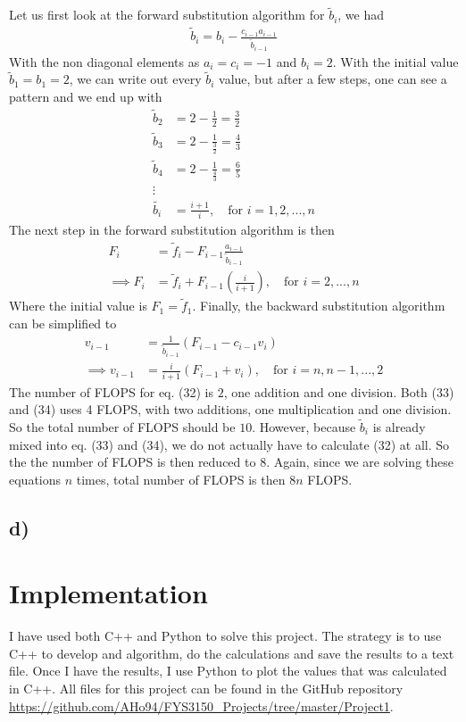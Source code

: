 \documentclass[12pt]{article}
\begin{document}
Let us first look at the forward substitution algorithm for $\tilde{b}_i$, we had
\begin{align}
\tilde{b}_i = b_i - \frac{c_{i-1}a_{i-1}}{\tilde{b}_{i-1}}
\end{align}
With the non diagonal elements as $a_i = c_i = -1$ and $b_i = 2$. With the initial value $\tilde{b}_1 = b_1 = 2$, we can write out every $\tilde{b}_i$ value, but after a few steps, one can see a pattern and we end up with
\begin{align}
\tilde{b}_2 &= 2 - \frac{1}{2} = \frac{3}{2} \nonumber \\
\tilde{b}_3 &= 2 - \frac{1}{\frac{3}{2}} = \frac{4}{3} \nonumber \\
\tilde{b}_4 &= 2 - \frac{1}{\frac{4}{3}} = \frac{6}{5} \nonumber \\
\vdots \nonumber \\
\tilde{b_i} &= \frac{i+1}{i}, \quad \text{for } i = 1,2,...,n
\end{align}
The next step in the forward substitution algorithm is then
\begin{align}
F_i &= \tilde{f}_i - F_{i-1}\frac{a_{i-1}}{\tilde{b}_{i-1}}  \nonumber \\
\implies F_i &= \tilde{f}_i + F_{i-1}\left(\frac{i}{i+1}\right), \quad \text{for } i=2,...,n
\end{align}
Where the initial value is $F_1 = \tilde{f}_1$. Finally, the backward substitution algorithm can be simplified to
\begin{align}
v_{i-1} &= \frac{1}{\tilde{b}_{i-1}}(F_{i-1}-c_{i-1}v_i) \nonumber \\
\implies v_{i-1} &= \frac{i}{i+1}(F_{i-1} + v_i), \quad \text{for } i = n, n-1, ..., 2
\end{align}
The number of FLOPS for eq. (32) is $2$, one addition and one division. Both (33) and (34) uses 4 FLOPS, with two additions, one multiplication and one division. So the total number of FLOPS should be $10$. However, because $\tilde{b}_i$ is already mixed into eq. (33) and (34), we do not actually have to calculate (32) at all. So the the number of FLOPS is then reduced to $8$. Again, since we are solving these equations $n$ times, total number of FLOPS is then $8n$ FLOPS.
\subsection*{d)}

\section{Implementation}
I have used both C++ and Python to solve this project. The strategy is to use C++ to develop and algorithm, do the calculations and save the results to a text file. Once I have the results, I use Python to plot the values that was calculated in C++. All files for this project can be found in the GitHub repository \url{https://github.com/AHo94/FYS3150_Projects/tree/master/Project1}.
\end{document}
